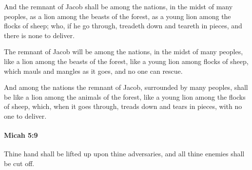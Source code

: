 			\begin{versebox}
					\item[BHS] 
					\item[LXX] 
					\item[ASV] And the remnant of Jacob shall be among the nations, in the midst of many peoples, as a lion among the beasts of the forest, as a young lion among the flocks of sheep; who, if he go through, treadeth down and teareth in pieces, and there is none to deliver.
					\item[NIV] The remnant of Jacob will be among the nations, in the midst of many peoples, like a lion among the beasts of the forest, like a young lion among flocks of sheep, which mauls and mangles as it goes, and no one can rescue.
					\item[NRSV] And among the nations the remnant of Jacob, surrounded by many peoples, shall be like a lion among the animals of the forest, like a young lion among the flocks of sheep, which, when it goes through, treads down and tears in pieces, with no one to deliver.
			\end{versebox}

		\paragraph{Micah 5:9} %
			\label{MICAH-5-9}

			Thine hand shall be lifted up upon thine adversaries, and all thine enemies shall be cut off.

